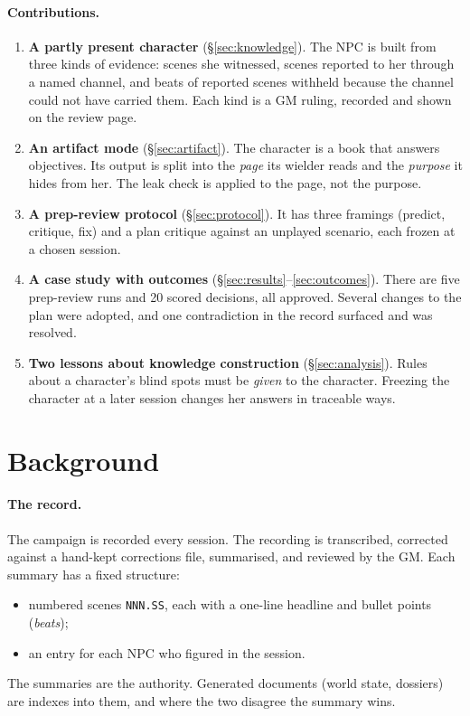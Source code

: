 \documentclass[11pt]{article}
\newcommand{\code}[1]{\texttt{#1}}
\begin{document}
\paragraph{Contributions.}
\begin{enumerate}[nosep]
\item \textbf{A partly present character} (\S\ref{sec:knowledge}). The NPC is built from
three kinds of evidence: scenes she witnessed, scenes reported to her through a named
channel, and beats of reported scenes withheld because the channel could not have carried
them. Each kind is a GM ruling, recorded and shown on the review page.
\item \textbf{An artifact mode} (\S\ref{sec:artifact}). The character is a book that
answers objectives. Its output is split into the \emph{page} its wielder reads and the
\emph{purpose} it hides from her. The leak check is applied to the page, not the purpose.
\item \textbf{A prep-review protocol} (\S\ref{sec:protocol}). It has three framings
(predict, critique, fix) and a plan critique against an unplayed scenario, each frozen at
a chosen session.
\item \textbf{A case study with outcomes} (\S\ref{sec:results}--\ref{sec:outcomes}). There
are five prep-review runs and 20 scored decisions, all approved. Several changes to the
plan were adopted, and one contradiction in the record surfaced and was resolved.
\item \textbf{Two lessons about knowledge construction} (\S\ref{sec:analysis}). Rules about
a character's blind spots must be \emph{given} to the character. Freezing the character at
a later session changes her answers in traceable ways.
\end{enumerate}

\section{Background}
\label{sec:background}

\paragraph{The record.} The campaign is recorded every session. The recording is
transcribed, corrected against a hand-kept corrections file, summarised, and reviewed by
the GM. Each summary has a fixed structure:
\begin{itemize}[nosep]
\item numbered scenes \code{NNN.SS}, each with a one-line headline and bullet points
(\emph{beats});
\item an entry for each NPC who figured in the session.
\end{itemize}
The summaries are the authority. Generated documents (world state, dossiers) are indexes
into them, and where the two disagree the summary wins.
\end{document}
